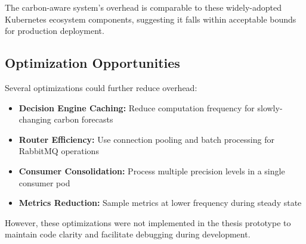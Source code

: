 The carbon-aware system's overhead is comparable to these widely-adopted Kubernetes ecosystem components, suggesting it falls within acceptable bounds for production deployment.

\subsection{Optimization Opportunities}

Several optimizations could further reduce overhead:

\begin{itemize}
    \item \textbf{Decision Engine Caching:} Reduce computation frequency for slowly-changing carbon forecasts
    \item \textbf{Router Efficiency:} Use connection pooling and batch processing for RabbitMQ operations
    \item \textbf{Consumer Consolidation:} Process multiple precision levels in a single consumer pod
    \item \textbf{Metrics Reduction:} Sample metrics at lower frequency during steady state
\end{itemize}

However, these optimizations were not implemented in the thesis prototype to maintain code clarity and facilitate debugging during development.

